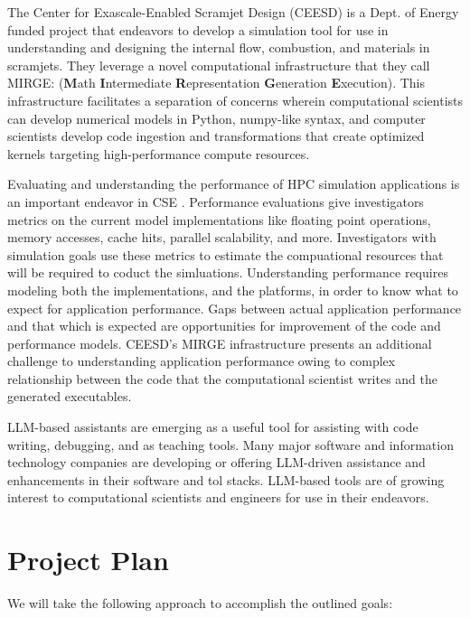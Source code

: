 \documentclass[11pt]{article}
\begin{document}
The Center for Exascale-Enabled Scramjet Design (CEESD) is a Dept. of Energy funded project that endeavors to develop a simulation tool for use in understanding and designing the internal flow, combustion, and materials in scramjets. They leverage a novel computational infrastructure that they call MIRGE: (\textbf{M}ath \textbf{I}ntermediate \textbf{R}epresentation \textbf{G}eneration \textbf{E}xecution)\cite{ref:AK2012}\cite{ref:AK2009}. This infrastructure facilitates a separation of concerns wherein computational scientists can develop numerical models in Python, numpy-like syntax, and computer scientists develop code ingestion and transformations that create optimized kernels targeting high-performance compute resources.

Evaluating and understanding the performance of HPC simulation applications is an important endeavor in CSE \cite{ref:Kolev2021}. Performance evaluations give investigators metrics on the current model implementations like floating point operations, memory accesses, cache hits, parallel scalability, and more.  Investigators with simulation goals use these metrics to estimate the compuational resources that will be required to coduct the simluations. Understanding performance requires modeling both the implementations, and the platforms, in order to know what to expect for application performance. Gaps between actual application performance and that which is expected are opportunities for improvement of the code and performance models. CEESD's MIRGE infrastructure presents an additional challenge to understanding application performance owing to complex relationship between the code that the computational scientist writes and the generated executables.

LLM-based assistants are emerging as a useful tool for assisting with code writing, debugging, and as teaching tools. Many major software and information technology companies are developing or offering LLM-driven assistance and enhancements in their software and tol stacks. LLM-based tools are of growing interest to computational scientists and engineers for use in their endeavors.   
\section{Project Plan}
We will take the following approach to accomplish the outlined goals:
\end{document}
